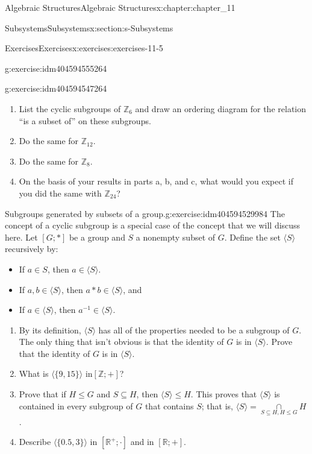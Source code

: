 \documentclass[twoside,10pt,]{book}
\numberwithin{equation}{section}
\begin{document}
\begin{chapterptx}{Algebraic Structures}{}{Algebraic Structures}{}{}{x:chapter:chapter_11}
\begin{sectionptx}{Subsystems}{}{Subsystems}{}{}{x:section:s-Subsystems}
\begin{exercises-subsection}{Exercises}{}{Exercises}{}{}{x:exercises:exercises-11-5}
\begin{divisionexercise}{4}{}{}{g:exercise:idm404594555264}
\end{divisionexercise}%
\begin{divisionexercise}{5}{}{}{g:exercise:idm404594547264}%
%
\begin{enumerate}[label=(\alph*)]
\item{}List the cyclic subgroups of \(\mathbb{Z}_6\) and draw an ordering diagram for the relation ``is a subset of'' on these subgroups.%
\item{}Do the same for \(\mathbb{Z}_{12}\).%
\item{}Do the same for \(\mathbb{Z}_8\).%
\item{}On the basis of your results in parts a, b, and c, what would you expect if you did the same with \(\mathbb{Z}_{24}\)?%
\end{enumerate}
%
\end{divisionexercise}%
\begin{divisionexercise}{6}{Subgroups generated by subsets of a group.}{}{g:exercise:idm404594529984}%
The concept of a cyclic subgroup is a special case of the concept that we will discuss here. Let \([G; * ]\) be a group and \(S\) a nonempty subset of \(G\). Define the set \(\langle S \rangle\) recursively by:%
\begin{itemize}[label=\textbullet]
\item{}If \(a\in S\), then \(a\in  \langle S \rangle\).%
\item{}If \(a, b \in \langle S \rangle\), then \(a * b \in \langle S \rangle\), and%
\item{}If \(a \in \langle S \rangle\), then \(a^{-1}\in \langle S \rangle\).%
\end{itemize}
%
\par
%
\begin{enumerate}[label=(\alph*)]
\item{}By its definition, \(\langle S \rangle\)  has all of the properties needed to be a subgroup of \(G\). The only thing that isn't obvious is that the identity of \(G\) is in \(\langle S \rangle\).  Prove that the identity of \(G\) is in \(\langle S \rangle\).%
\item{}What is \(\langle\{9, 15\}\rangle\) in\([\mathbb{Z}; +]\)?%
\item{}Prove that if \(H \leq  G\) and \(S \subseteq  H\), then \(\langle S \rangle\leq H\). This proves that \(\langle S \rangle\) is contained in every subgroup of \(G\) that contains \(S\); that is, \(\langle S \rangle =\underset{S\subseteq H, H\leq G}{\cap }H\).%
\item{}Describe \(\langle \{0.5, 3\}\rangle \) in \(\left[ \mathbb{R}^+;\cdot \right]\) and in \([\mathbb{R}; +]\).%

\end{enumerate}
\end{divisionexercise}
\end{exercises-subsection}
\end{sectionptx}
\end{chapterptx}
\end{document}
